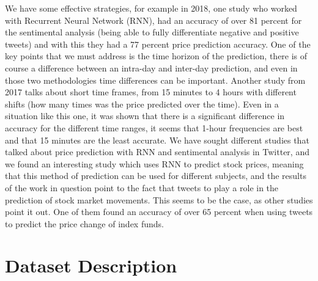 \documentclass[conference]{IEEEtran}
\begin{document}
We have some effective strategies, for example in 2018, one study who worked with Recurrent Neural Network (RNN), had an accuracy of over 81 percent for the sentimental analysis (being able to fully differentiate negative and positive tweets) and with this they had a 77 percent price prediction accuracy. \cite{b1}\newline
\newline
One of the key points that we must address is the time horizon of the prediction, there is of course a difference between an intra-day and inter-day prediction, and even in those two methodologies time differences can be important. Another study from 2017 talks about short time frames, from 15 minutes to 4 hours with different shifts (how many times was the price predicted over the time). Even in a situation like this one, it was shown that there is a significant difference in accuracy for the different time ranges, it seems that 1-hour frequencies are best and that 15 minutes are the least accurate.\cite{b2}\newline
\newline
We have sought different studies that talked about price prediction with RNN and sentimental analysis in Twitter, and we found an interesting study which uses RNN to predict stock prices, meaning that this method of prediction can be used for different subjects, and the results of the work in question point to the fact that tweets to play a role in the prediction of stock market movements.\cite{b3} \newline
\newline
This seems to be the case, as other studies point it out. One of them found an accuracy of over 65 percent when using tweets to predict the price change of index funds.\cite{b3}\newline
\newline
\section{Dataset Description}
\end{document}
